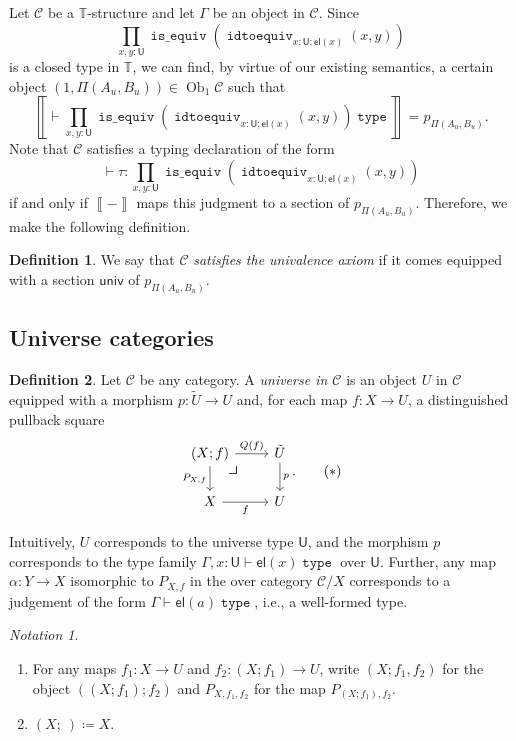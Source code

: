 \documentclass[10pt,letterpaper,cm]{nupset}
\theoremstyle{definition}
\newtheorem{definition}{Definition}[subsection]
\theoremstyle{theorem}
\theoremstyle{remark}
\newtheorem*{notation}{Notation}
\DeclareMathOperator{\ob}{Ob}
\newcommand{\U}{\mathsf{U}}
\newcommand{\el}{\mathsf{el}}
\newcommand{\univv}{\mathsf{univ}}
\newcommand{\0}{\mathbf{0}}
\newcommand{\1}{\mathbf{1}}
\newcommand{\2}{\mathbf{2}}
\DeclareMathOperator{\type}{\mathtt{type}}
\DeclareMathOperator{\isequiv}{\mathtt{is\_equiv}}
\DeclareMathOperator{\equiveq}{\mathtt{idtoequiv}}
\renewcommand{\c}{\mathscr{C}}
\newcommand{\T}{\mathbb T}
\newcommand{\be}{\begin{enumerate}}
\newcommand{\ee}{\end{enumerate}}
\begin{document}
\medskip

Let $\c$ be a $\T$-structure and let $\Gamma$ be an object in $\c$. Since $$ \prod_{x,y:\U} \isequiv\left(\equiveq_{{x:\U}; \el(x)}(x,y)\right)$$ is a closed type in $\T$, we can find, by virtue of our existing semantics, a certain object $\left(1, \Pi(A_u, B_u)\right) \in \ob_{1}{\c}$ such that $$\left\llbracket{{ }\vdash \prod_{x,y:\U} \isequiv\left(\equiveq_{{x:\U}; \el(x)}(x,y)\right) \type}\right\rrbracket = p_{ \Pi(A_u, B_u)} .$$ Note that $\c$ satisfies a typing declaration of the form $$ \vdash \tau :  \prod_{x,y:\U} \isequiv\left(\equiveq_{{x:\U}; \el(x)}(x,y)\right)$$ if and only if $\left\llbracket{-}\right\rrbracket$ maps this judgment to a section of $p_{ \Pi(A_u, B_u)}$. Therefore, we make the following definition.

\begin{definition}
We say that $\c$ \textit{satisfies the univalence axiom} if it comes equipped with a section $\univv$ of $p_{ \Pi(A_u, B_u)}$.
\end{definition}

\subsection{Universe categories}


\begin{definition}\label{univ1}
Let $\c$ be any category. A \textit{universe in $\c$} is an object $U$ in $\c$ equipped with a morphism $p: \tilde{U} \to U$ and, for each map $f: X \to U$, a distinguished pullback square
\[
\label{eqn:uobj} \begin{tikzcd}
\left(X; f\right) \arrow[d, "{P_{X,f}}"'] \arrow[r, "Q(f)"] \arrow[dr, phantom, "\scalebox{1.5}{\color{black}$\lrcorner$}", very near start] & \tilde{U} \arrow[d, "p"] \\
X \arrow[r, "f"']                                           & U                       
\end{tikzcd}. \tag{$\ast$}
\]
\end{definition} 

Intuitively, $U$ corresponds to the universe type $\U$, and the morphism $p$ corresponds to the type family $\Gamma, x: \U \vdash \el(x) \type$ over $\U$. Further, any map $\alpha : Y \to X$ isomorphic to $P_{X,f}$ in the over category $\c/X$ corresponds to a judgement of the form $\Gamma \vdash \el(a) \type$, i.e., a well-formed type.  

\begin{notation} $ $
\be
\item For any maps $f_1 : X \to U$ and $f_2 : \left(X; f_1\right) \to U$, write $\left(X; f_1, f_2\right)$ for the object $\left(\left(X; f_1\right); f_2\right)$ and $P_{X, f_1, f_2}$ for the map $P_{\left(X; f_1\right), f_2}$.
\item $\left(X; \ \right) \coloneqq X$.
\ee
\end{notation}
\end{document}
